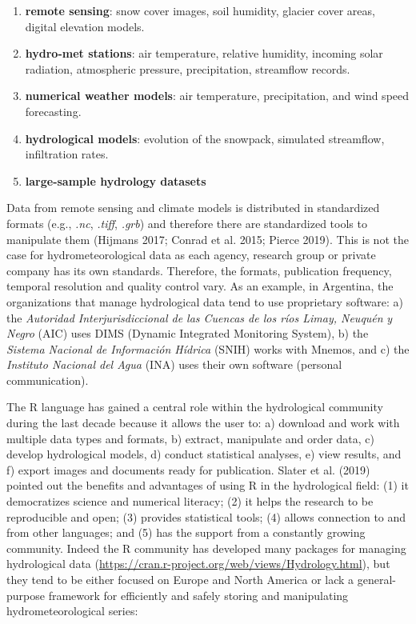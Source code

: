 \begin{enumerate}
\def\labelenumi{\alph{enumi}.}
\item
  \textbf{remote sensing}: snow cover images, soil humidity, glacier cover
  areas, digital elevation models.
\item
  \textbf{hydro-met stations}: air temperature, relative humidity, incoming
  solar radiation, atmospheric pressure, precipitation, streamflow
  records.
\item
  \textbf{numerical weather models}: air temperature, precipitation, and
  wind speed forecasting.
\item
  \textbf{hydrological models}: evolution of the snowpack, simulated
  streamflow, infiltration rates.
\item
  \textbf{large-sample hydrology datasets}
\end{enumerate}

\noindent
Data from remote sensing and climate models is distributed in
standardized formats (e.g., \emph{.nc}, \emph{.tiff}, \emph{.grb}) and therefore there
are standardized tools to manipulate them (Hijmans 2017; Conrad et al. 2015; Pierce 2019). This is not the case for hydrometeorological data as each
agency, research group or private company has its own standards.
Therefore, the formats, publication frequency, temporal resolution and
quality control vary. As an example, in Argentina, the
organizations that manage hydrological data tend to use proprietary software:
a) the \emph{Autoridad Interjurisdiccional de las Cuencas de los ríos Limay, Neuquén}
\emph{y Negro} (AIC) uses DIMS (Dynamic Integrated Monitoring System), b) the
\emph{Sistema Nacional de Información Hídrica} (SNIH) works with Mnemos, and
c) the \emph{Instituto Nacional del Agua} (INA) uses their own software
(personal communication).

The R language has gained a central role within the hydrological
community during the last decade because it allows the user to: a)
download and work with multiple data types and formats, b) extract,
manipulate and order data, c) develop hydrological models, d) conduct
statistical analyses, e) view results, and f) export images and
documents ready for publication. Slater et al. (2019) pointed out the
benefits and advantages of using R in the hydrological
field: (1) it democratizes science and numerical literacy; (2) it helps
the research to be reproducible and open; (3) provides statistical
tools; (4) allows connection to and from other languages; and (5) has
the support from a constantly growing community. Indeed the R
community has developed many packages for managing hydrological data
(\url{https://cran.r-project.org/web/views/Hydrology.html}), but they tend
to be either focused on Europe and North America or lack a
general-purpose framework for efficiently and safely storing and manipulating
hydrometeorological series:


